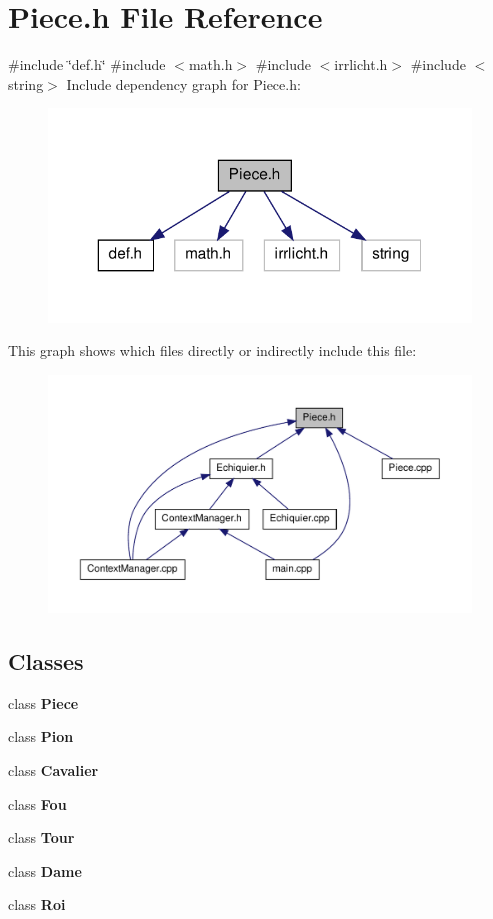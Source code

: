 \section{\-Piece.\-h \-File \-Reference}
\label{_piece_8h}
{\ttfamily \#include \char`\"{}def.\-h\char`\"{}}\*
{\ttfamily \#include $<$math.\-h$>$}\*
{\ttfamily \#include $<$irrlicht.\-h$>$}\*
{\ttfamily \#include $<$string$>$}\*
\-Include dependency graph for \-Piece.\-h\-:
\nopagebreak
\begin{figure}[H]
\begin{center}
\leavevmode
\includegraphics[width=332pt]{_piece_8h__incl}
\end{center}
\end{figure}
\-This graph shows which files directly or indirectly include this file\-:
\nopagebreak
\begin{figure}[H]
\begin{center}
\leavevmode
\includegraphics[width=350pt]{_piece_8h__dep__incl}
\end{center}
\end{figure}
\subsection*{\-Classes}
\begin{DoxyCompactItemize}
\item 
class {\bf \-Piece}
\item 
class {\bf \-Pion}
\item 
class {\bf \-Cavalier}
\item 
class {\bf \-Fou}
\item 
class {\bf \-Tour}
\item 
class {\bf \-Dame}
\item 
class {\bf \-Roi}
\end{DoxyCompactItemize}
